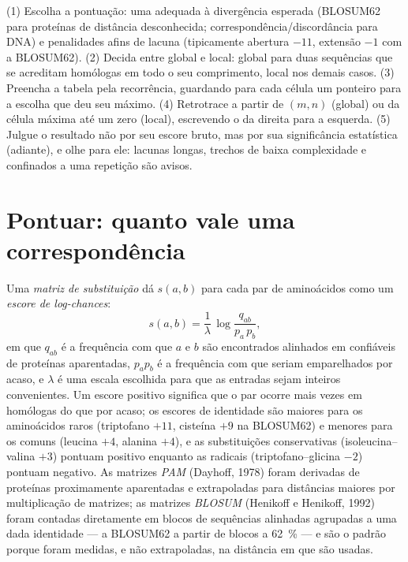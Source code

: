 \begin{method}\label{met:b3:bioinformatics:align}
(1) Escolha a pontuação: uma  adequada à
divergência esperada (BLOSUM62 para proteínas de distância
desconhecida; correspondência/discordância para DNA) e penalidades
afins de lacuna (tipicamente abertura $-11$, extensão $-1$ com a
BLOSUM62). (2) Decida entre global e local: global para duas
sequências que se acreditam homólogas em todo o seu comprimento, local
nos demais casos. (3) Preencha a tabela pela recorrência, guardando
para cada célula um ponteiro para a escolha que deu seu máximo. (4)
Retrotrace a partir de $(m,n)$ (global) ou da célula máxima até um zero
(local), escrevendo o  da direita para a esquerda. (5)
Julgue o resultado não por seu escore bruto, mas por sua significância
estatística (adiante), e olhe para ele: lacunas longas, trechos de
baixa complexidade e  confinados a uma repetição são
avisos.
\end{method}

\section{Pontuar: quanto vale uma correspondência}

\begin{definition}\label{def:b3:bioinformatics:matrices}
Uma \emph{matriz de substituição} dá $s(a,b)$ para cada par de
aminoácidos como um \emph{escore de log-chances}:
\[
s(a,b) = \frac{1}{\lambda}\,\log\frac{q_{ab}}{p_{a}\,p_{b}},
\]
em que $q_{ab}$ é a frequência com que $a$ e $b$ são encontrados
alinhados em  confiáveis de proteínas aparentadas,
$p_{a} p_{b}$ é a frequência com que seriam emparelhados por acaso, e
$\lambda$ é uma escala escolhida para que as entradas sejam inteiros
convenientes. Um escore positivo significa que o par ocorre mais vezes
em homólogas do que por acaso; os escores de identidade são maiores
para os aminoácidos raros (triptofano $+11$, cisteína $+9$ na
BLOSUM62) e menores para os comuns (leucina $+4$, alanina $+4$), e as
substituições conservativas (isoleucina--valina $+3$) pontuam positivo
enquanto as radicais (triptofano--glicina $-2$) pontuam negativo. As
matrizes \emph{PAM} (Dayhoff, 1978) foram derivadas de proteínas
proximamente aparentadas e extrapoladas para distâncias maiores por
multiplicação de matrizes; as matrizes \emph{BLOSUM} (Henikoff e
Henikoff, 1992) foram contadas diretamente em blocos de sequências
alinhadas agrupadas a uma dada identidade --- a BLOSUM62 a partir de
blocos a \qty{62}{\%} --- e são o padrão porque foram medidas, e não
extrapoladas, na distância em que são usadas.
\end{definition}

